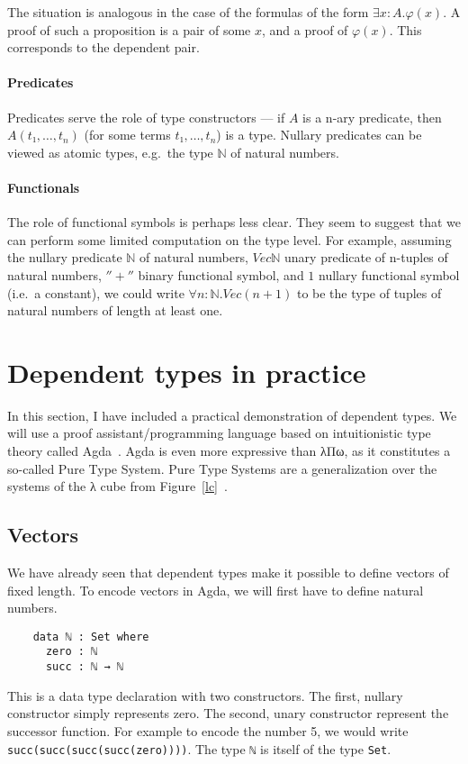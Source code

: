 \documentclass[12pt]{article}
\begin{document}
The situation is analogous in the case of the formulas of the form $∃x:A.φ(x)$. A proof of such a proposition is a pair of some $x$, and a proof of $φ(x)$. This corresponds to the dependent pair.

\paragraph{Predicates}
Predicates serve the role of type constructors — if $A$ is a n-ary predicate, then $A(t₁, …, t_n)$ (for some terms $t₁, …, t_n$) is a type. Nullary predicates can be viewed as atomic types, e.g.~the type $ℕ$ of natural numbers.

\paragraph{Functionals}
The role of functional symbols is perhaps less clear. They seem to suggest that we can perform some limited computation on the type level. For example, assuming the nullary  predicate $ℕ$ of natural numbers, $Vecℕ$ unary predicate of n-tuples of natural numbers, $''+''$ binary functional symbol, and $1$ nullary functional symbol (i.e.~a constant), we could write $∀n:ℕ.Vec(n+1)$ to be the type of tuples of natural numbers of length at least one.


\section{Dependent types in practice}
In this section, I have included a practical demonstration of dependent types. We will use a proof assistant/programming language based on intuitionistic type theory called Agda~\cite{norell2007towards}. Agda is even more expressive than λΠω, as it constitutes a so-called Pure Type System. Pure Type Systems are a generalization over the systems of the λ cube from Figure~\ref{lc}~\cite{sorensen2006lectures}.

\subsection{Vectors}
We have already seen that dependent types make it possible to define vectors of fixed length. To encode vectors in Agda, we will first have to define natural numbers.
\begin{verbatim}
    data ℕ : Set where
      zero : ℕ 
      succ : ℕ → ℕ
\end{verbatim}
This is a data type declaration with two constructors. The first, nullary constructor simply represents zero. The second, unary constructor represent the successor function. For example to encode the number 5, we would write \verb|succ(succ(succ(succ(zero))))|. The type \verb|ℕ| is itself of the type \verb|Set|.
\end{document}
